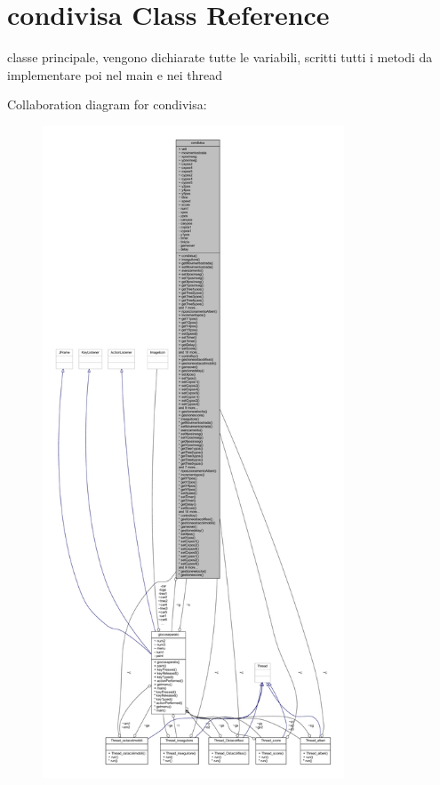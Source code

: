 \hypertarget{classcargame_1_1condivisa}{}\section{condivisa Class Reference}
\label{classcargame_1_1condivisa}


classe principale, vengono dichiarate tutte le variabili, scritti tutti i metodi da implementare poi nel main e nei thread  




Collaboration diagram for condivisa\+:
\nopagebreak
\begin{figure}[H]
\begin{center}
\leavevmode
\includegraphics[height=550pt]{classcargame_1_1condivisa__coll__graph}
\end{center}
\end{figure}
